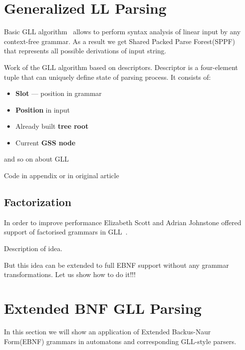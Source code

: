 \documentclass[runningheads,a4paper]{llncs}
\begin{document}
\section{Generalized LL Parsing}%

Basic GLL algorithm~\cite{scott2010gll} allows to perform syntax analysis of linear input by any context-free 
grammar. As a result we get Shared Packed Parse Forest(SPPF)~\cite{SPPF} that represents all possible derivations of input string.

Work of the GLL algorithm based on descriptors. Descriptor is a four-element tuple that can uniquely define state 
of parsing process. It consists of:
\begin{itemize}
    \item \textbf{Slot} --- position in grammar
    \item \textbf{Position} in input
    \item Already built \textbf{tree root}
    \item Current \textbf{GSS node}
\end{itemize}

and so on about GLL

Code in appendix or in original article

\subsection{Factorization}%

In order to improve performance Elizabeth Scott and Adrian Johnstone offered support of factorised grammars in GLL~\cite{scott2016structuring}. 

Description of idea.

But this idea can be extended to full EBNF support without any grammar transformations.
Let us show how to do it!!!


\section{Extended BNF GLL Parsing}%

In this section we will show an application of Extended Backus-Naur Form(EBNF) grammars in automatons and corresponding GLL-style parsers.
\end{document}

